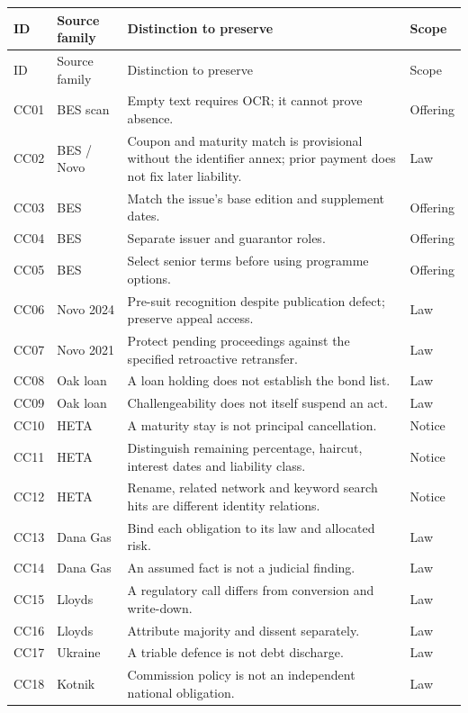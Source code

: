 \documentclass[12pt,a4paper,oneside,openany]{book}
\begin{document}
{\small
\begin{longtable}{P{0.07\textwidth}P{0.18\textwidth}P{0.50\textwidth}P{0.10\textwidth}}
\toprule
ID & Source family & Distinction to preserve & Scope \\
\midrule
\endfirsthead
\toprule
ID & Source family & Distinction to preserve & Scope \\
\midrule
\endhead
CC01 & BES scan & Empty text requires OCR; it cannot prove absence. & Offering \\
CC02 & BES / Novo & Coupon and maturity match is provisional without the identifier annex; prior payment does not fix later liability. & Law \\
CC03 & BES & Match the issue's base edition and supplement dates. & Offering \\
CC04 & BES & Separate issuer and guarantor roles. & Offering \\
CC05 & BES & Select senior terms before using programme options. & Offering \\
CC06 & Novo 2024 & Pre-suit recognition despite publication defect; preserve appeal access. & Law \\
CC07 & Novo 2021 & Protect pending proceedings against the specified retroactive retransfer. & Law \\
CC08 & Oak loan & A loan holding does not establish the bond list. & Law \\
CC09 & Oak loan & Challengeability does not itself suspend an act. & Law \\
CC10 & HETA & A maturity stay is not principal cancellation. & Notice \\
CC11 & HETA & Distinguish remaining percentage, haircut, interest dates and liability class. & Notice \\
CC12 & HETA & Rename, related network and keyword search hits are different identity relations. & Notice \\
CC13 & Dana Gas & Bind each obligation to its law and allocated risk. & Law \\
CC14 & Dana Gas & An assumed fact is not a judicial finding. & Law \\
CC15 & Lloyds & A regulatory call differs from conversion and write-down. & Law \\
CC16 & Lloyds & Attribute majority and dissent separately. & Law \\
CC17 & Ukraine & A triable defence is not debt discharge. & Law \\
CC18 & Kotnik & Commission policy is not an independent national obligation. & Law \\

\end{longtable}}
\end{document}
